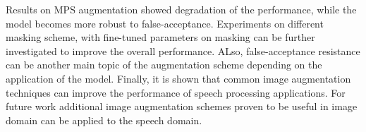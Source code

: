 \documentclass[10pt,twocolumn,letterpaper]{article}
\begin{document}
Results on MPS augmentation showed degradation of the performance, while the model becomes more robust to false-acceptance.
Experiments on different masking scheme, with fine-tuned parameters on masking can be further investigated to improve the overall performance.
ALso, false-acceptance resistance can be another main topic of the augmentation scheme depending on the application of the model.
Finally, it is shown that common image augmentation techniques can improve the performance of speech processing applications.
For future work additional image augmentation schemes proven to be useful in image domain can be applied to the speech domain.

{\small


}
\end{document}
